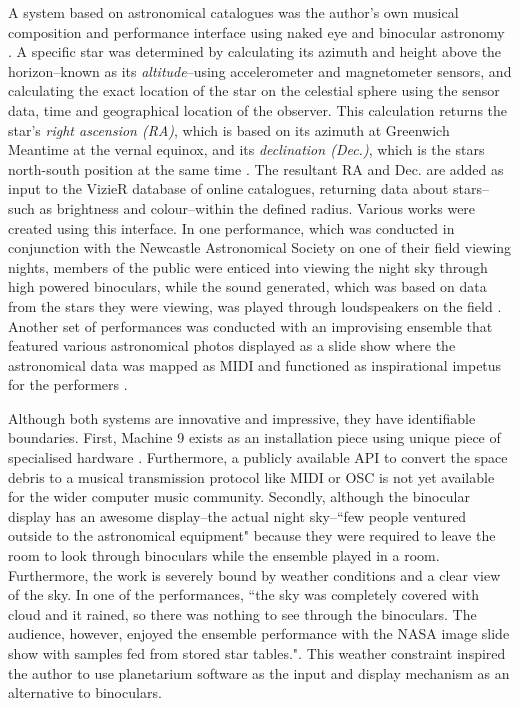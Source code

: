 \documentclass[10pt,a4paper,extrafontsizes]{memoir}
\begin{document}
A system based on astronomical catalogues was the author's own musical composition and performance interface using naked eye and binocular astronomy \cite{fraietta2014musical}. A specific star was determined by calculating its azimuth and height above the horizon--known as its \textit {altitude}--using  accelerometer and magnetometer sensors, and calculating the exact location of the star on the celestial sphere using the sensor data, time and geographical location of the observer. This calculation returns the star's \textit{right ascension (RA)}, which is based on its azimuth at Greenwich Meantime at the vernal equinox,  and its \textit{declination (Dec.)}, which is the stars north-south position at the same time \cite{duffett2011practical, fraietta2014musical}. The resultant RA and Dec. are added as input to the VizieR database of online catalogues, returning data about stars--such as brightness and colour--within the defined radius. Various works were created using this interface. In one performance, which was  conducted in conjunction with the Newcastle Astronomical Society on one of their field viewing nights, members of the  public were enticed into viewing the night sky through high powered binoculars, while the sound generated, which was  based on data from the stars they were viewing, was played through loudspeakers on the field \cite{fraietta_segue}. 
Another set of performances was conducted with an improvising ensemble that featured various astronomical photos displayed as a slide show where the astronomical data was mapped as MIDI and functioned as inspirational impetus for the performers \cite{BriightSyzygy}. 

Although both systems are innovative and impressive, they have identifiable boundaries. First, Machine 9 exists as an installation piece using unique piece of specialised hardware \cite{spaceDebrisYoutube}.  Furthermore, a publicly available API to convert the space debris to a musical transmission protocol like MIDI or OSC \cite{wright1997open} is not yet available for the wider computer music community. Secondly, although the binocular display has an awesome display--the actual night sky--``few people ventured outside to the astronomical equipment"\cite[p. ~50]{fraietta2014musical} because they were required to leave the room to look through binoculars while the ensemble played in a room. Furthermore, the work is severely bound by weather conditions and a clear view of the sky. In one of the performances, ``the sky was completely covered with cloud and it rained, so there was nothing to see through the binoculars. The audience, however, enjoyed the ensemble performance with the NASA image slide show with samples fed from stored star tables."\cite[p. ~50]{fraietta2014musical}.  This weather constraint inspired the author to use planetarium software as the input and display mechanism as an alternative to binoculars.  
\end{document}
